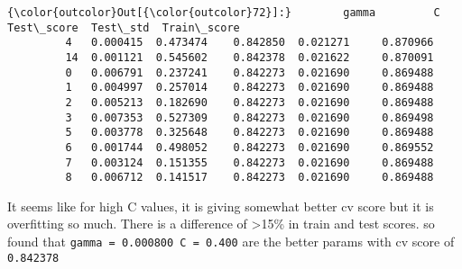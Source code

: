 \documentclass[11pt]{article}
\begin{document}
\begin{Verbatim}[commandchars=\\\{\}]
{\color{outcolor}Out[{\color{outcolor}72}]:}        gamma         C  Test\_score  Test\_std  Train\_score
         4   0.000415  0.473474    0.842850  0.021271     0.870966
         14  0.001121  0.545602    0.842378  0.021622     0.870091
         0   0.006791  0.237241    0.842273  0.021690     0.869488
         1   0.004997  0.257014    0.842273  0.021690     0.869488
         2   0.005213  0.182690    0.842273  0.021690     0.869488
         3   0.007353  0.527309    0.842273  0.021690     0.869498
         5   0.003778  0.325648    0.842273  0.021690     0.869488
         6   0.001744  0.498052    0.842273  0.021690     0.869552
         7   0.003124  0.151355    0.842273  0.021690     0.869488
         8   0.006712  0.141517    0.842273  0.021690     0.869488
\end{Verbatim}
            
    It seems like for high C values, it is giving somewhat better cv score
but it is overfitting so much. There is a difference of
\textgreater{}15\% in train and test scores. so found that
\texttt{gamma\ =\ 0.000800\ C\ =\ 0.400} are the better params with cv
score of \texttt{0.842378}
\end{document}
